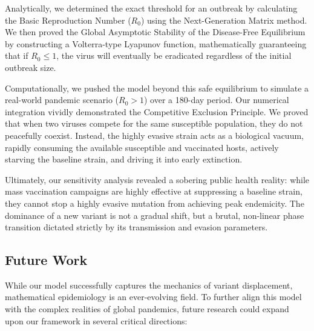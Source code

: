 \documentclass[12pt]{article}
\begin{document}
Analytically, we determined the exact threshold for an outbreak by calculating the Basic Reproduction Number ($R_0$) using the Next-Generation Matrix method. We then proved the Global Asymptotic Stability of the Disease-Free Equilibrium by constructing a Volterra-type Lyapunov function, mathematically guaranteeing that if $R_0 \le 1$, the virus will eventually be eradicated regardless of the initial outbreak size. 

Computationally, we pushed the model beyond this safe equilibrium to simulate a real-world pandemic scenario ($R_0 > 1$) over a 180-day period. Our numerical integration vividly demonstrated the Competitive Exclusion Principle. We proved that when two viruses compete for the same susceptible population, they do not peacefully coexist. Instead, the highly evasive strain acts as a biological vacuum, rapidly consuming the available susceptible and vaccinated hosts, actively starving the baseline strain, and driving it into early extinction. 

Ultimately, our sensitivity analysis revealed a sobering public health reality: while mass vaccination campaigns are highly effective at suppressing a baseline strain, they cannot stop a highly evasive mutation from achieving peak endemicity. The dominance of a new variant is not a gradual shift, but a brutal, non-linear phase transition dictated strictly by its transmission and evasion parameters.

\subsection{Future Work}
While our model successfully captures the mechanics of variant displacement, mathematical epidemiology is an ever-evolving field. To further align this model with the complex realities of global pandemics, future research could expand upon our framework in several critical directions:
\end{document}

